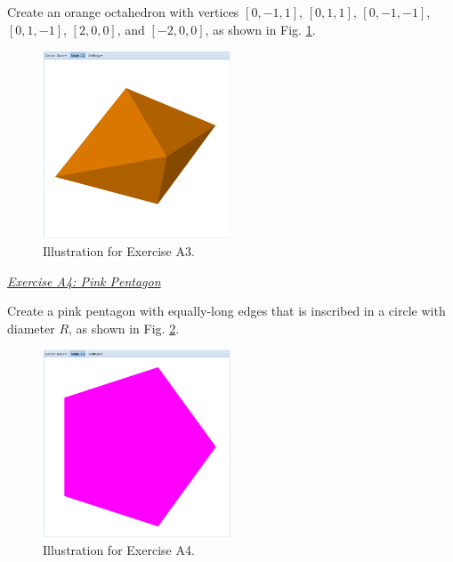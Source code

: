 \documentclass[article,A4,12pt]{llncs}
\begin{document}
Create an orange octahedron with vertices 
$[0, -1, 1]$, $[0, 1, 1]$, $[0, -1, -1]$, $[0, 1, -1]$, $[2, 0, 0]$, and $[-2, 0, 0]$, 
as shown in Fig. \ref{fig:a3}.

\begin{figure}[!ht]
\begin{center}
\includegraphics[width=0.5\textwidth]{img/a3-orange-octahedron.png}
\end{center}
\vspace{-2mm}
\caption{Illustration for Exercise A3.}
\label{fig:a3}
\end{figure}

\noindent
\underline{\em Exercise A4: Pink Pentagon}

Create a pink pentagon with equally-long edges that is inscribed 
in a circle with diameter $R$, as shown in Fig. \ref{fig:a4}.

\newpage

\begin{figure}[!ht]
\begin{center}
\includegraphics[width=0.5\textwidth]{img/a4-pink-pentagon.png}
\end{center}
\vspace{-4mm}
\caption{Illustration for Exercise A4.}
\label{fig:a4}
\vspace{-4mm}
\end{figure}
\end{document}
